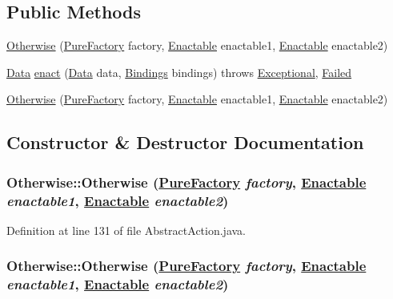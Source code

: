 \subsection*{Public Methods}
\begin{CompactItemize}
\item 
\hyperlink{classOtherwise_a0}{Otherwise} (\hyperlink{classPureFactory}{Pure\-Factory} factory, \hyperlink{interfaceEnactable}{Enactable} enactable1, \hyperlink{interfaceEnactable}{Enactable} enactable2)
\item 
\hyperlink{interfaceData}{Data} \hyperlink{classOtherwise_a1}{enact} (\hyperlink{interfaceData}{Data} data, \hyperlink{interfaceBindings}{Bindings} bindings) throws \hyperlink{classExceptional}{Exceptional}, \hyperlink{classFailed}{Failed}
\item 
\hyperlink{classOtherwise_a2}{Otherwise} (\hyperlink{classPureFactory}{Pure\-Factory} factory, \hyperlink{interfaceEnactable}{Enactable} enactable1, \hyperlink{interfaceEnactable}{Enactable} enactable2)
\end{CompactItemize}


\subsection{Constructor \& Destructor Documentation}
\hypertarget{classOtherwise_a0}{
\subsubsection[Otherwise]{\setlength{\rightskip}{0pt plus 5cm}Otherwise::Otherwise (\hyperlink{classPureFactory}{Pure\-Factory} {\em factory}, \hyperlink{interfaceEnactable}{Enactable} {\em enactable1}, \hyperlink{interfaceEnactable}{Enactable} {\em enactable2})}}
\label{classOtherwise_a0}




Definition at line 131 of file Abstract\-Action.java.\hypertarget{classOtherwise_a2}{
\subsubsection[Otherwise]{\setlength{\rightskip}{0pt plus 5cm}Otherwise::Otherwise (\hyperlink{classPureFactory}{Pure\-Factory} {\em factory}, \hyperlink{interfaceEnactable}{Enactable} {\em enactable1}, \hyperlink{interfaceEnactable}{Enactable} {\em enactable2})}}
\label{classOtherwise_a2}




